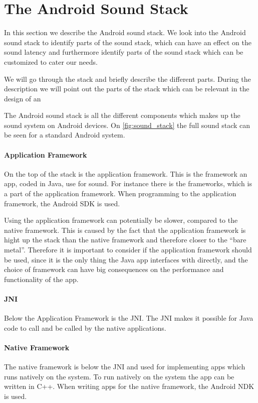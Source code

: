 \section{The Android Sound Stack}
In this section we describe the Android sound stack.
We look into the Android sound stack to identify parts of the sound stack,
which can have an effect on the sound latency and furthermore identify parts of the sound stack which can be customized to cater our needs.

We will go through the stack and briefly describe the different parts.
During the description we will point out the parts of the stack which can be relevant in the design of an 

The Android sound stack is all the different components which makes up the sound system on Android devices.
On \cref{fig:sound_stack} the full sound stack can be seen for a standard Android system.

\paragraph{Application Framework}
On the top of the stack is the application framework.
This is the framework an app, coded in Java, use for sound.
For instance there is the  frameworks, which is a part of the application framework.
When programming to the application framework, the Android \ac{SDK} is used.

Using the application framework can potentially be slower, compared to the native framework.
This is caused by the fact that the application framework is hight up the stack than the native framework and therefore closer to the ``bare metal''.
Therefore it is important to consider if the application framework should be used,
since it is the only thing the Java app interfaces with directly, 
and the choice of framework can have big consequences on the performance and functionality of the app.

\paragraph{JNI}
Below the Application Framework is the \ac{JNI}.
The \ac{JNI} makes it possible for Java code to call and be called by the native applications\cite{jni}.

\paragraph{Native Framework}
The native framework is below the \ac{JNI} and used for implementing apps which runs natively on the system.
To run natively on the system the app can be written in C++.
When writing apps for the native framework, the Android \ac{NDK} is used.

